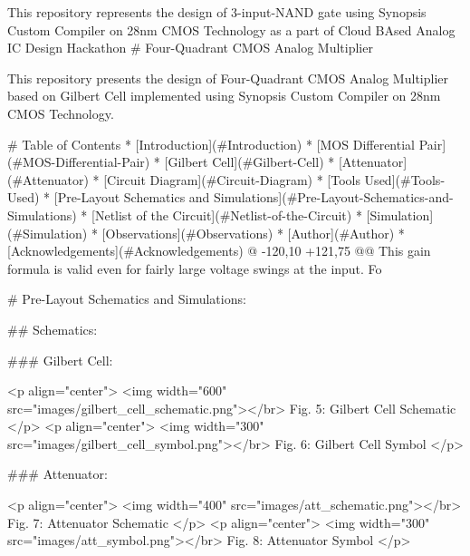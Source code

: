
This repository represents the design of 3-input-NAND gate using Synopsis Custom Compiler on 28nm CMOS Technology as a part of Cloud BAsed Analog IC Design Hackathon 
# Four-Quadrant CMOS Analog Multiplier

This repository presents the design of Four-Quadrant CMOS Analog Multiplier based on Gilbert Cell implemented using Synopsis Custom Compiler on 28nm CMOS Technology.

# Table of Contents
 * [Introduction](#Introduction)
 * [MOS Differential Pair](#MOS-Differential-Pair)
 * [Gilbert Cell](#Gilbert-Cell)
 * [Attenuator](#Attenuator)
 * [Circuit Diagram](#Circuit-Diagram)
 * [Tools Used](#Tools-Used)
 * [Pre-Layout Schematics and Simulations](#Pre-Layout-Schematics-and-Simulations)
 * [Netlist of the Circuit](#Netlist-of-the-Circuit)
 * [Simulation](#Simulation)
 * [Observations](#Observations)
 * [Author](#Author)
 * [Acknowledgements](#Acknowledgements)
@ -120,10 +121,75 @@ This gain formula is valid even for fairly large voltage swings at the input. Fo

# Pre-Layout Schematics and Simulations:

## Schematics:

### Gilbert Cell:

<p align="center">
  <img width="600" src="images/gilbert_cell_schematic.png"></br>
  Fig. 5: Gilbert Cell Schematic
</p>
<p align="center">
  <img width="300" src="images/gilbert_cell_symbol.png"></br>
  Fig. 6: Gilbert Cell Symbol
</p>

### Attenuator:

<p align="center">
  <img width="400" src="images/att_schematic.png"></br>
  Fig. 7: Attenuator Schematic
</p>
<p align="center">
  <img width="300" src="images/att_symbol.png"></br>
  Fig. 8: Attenuator Symbol
</p>

